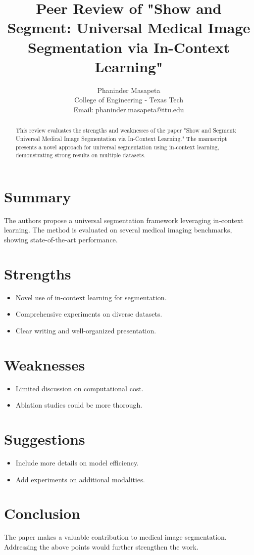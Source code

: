 \documentclass[conference]{IEEEtran}
\title{Peer Review of "Show and Segment: Universal Medical Image Segmentation via In-Context Learning"}
\author{
    Phaninder Masapeta \\
    College of Engineering - Texas Tech\\
    Email: phaninder.masapeta@ttu.edu
}
\begin{document}
\maketitle

\begin{abstract}
This review evaluates the strengths and weaknesses of the paper "Show and Segment: Universal Medical Image Segmentation via In-Context Learning." The manuscript presents a novel approach for universal segmentation using in-context learning, demonstrating strong results on multiple datasets.
\end{abstract}

\section{Summary}
The authors propose a universal segmentation framework leveraging in-context learning. The method is evaluated on several medical imaging benchmarks, showing state-of-the-art performance.

\section{Strengths}
\begin{itemize}
    \item Novel use of in-context learning for segmentation.
    \item Comprehensive experiments on diverse datasets.
    \item Clear writing and well-organized presentation.
\end{itemize}

\section{Weaknesses}
\begin{itemize}
    \item Limited discussion on computational cost.
    \item Ablation studies could be more thorough.
\end{itemize}

\section{Suggestions}
\begin{itemize}
    \item Include more details on model efficiency.
    \item Add experiments on additional modalities.
\end{itemize}

\section{Conclusion}
The paper makes a valuable contribution to medical image segmentation. Addressing the above points would further strengthen the work.



\end{document}
